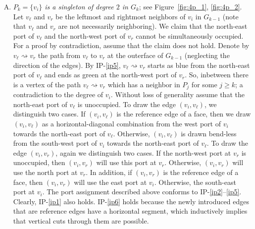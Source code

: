 \documentclass[a4paper,twoside,11pt]{article}
\begin{document}
\begin{enumerate}[C.1:]

\item \label{c:sing3} \emph{$P_k = \{ v_i \}$ is a singleton of
degree $2$ in $G_k$}; see Figure~\ref{fig:4p_1}, \ref{fig:4p_2}. Let
$v_\ell$ and $v_r$ be the leftmost and rightmost neighbors of $v_i$ in
$G_{k-1}$ (note that $v_\ell$ and $v_r$ are not necessarily
neighboring). We claim that the north-east port of $v_\ell$ and the
north-west port of $v_r$ cannot be simultaneously occupied. For a
proof by contradiction, assume that the claim does not hold. Denote
by $v_\ell \rightsquigarrow v_r$ the path from $v_\ell$ to $v_r$ at
the outerface of $G_{k-1}$ (neglecting the direction of the edges).
By IP-\ref{ip5}, $v_\ell \rightsquigarrow v_r$ starts as blue from
the north-east port of $v_\ell$ and ends as green at the north-west
port of $v_r$. So, inbetween there is a vertex of the path $v_\ell
\rightsquigarrow v_r$ which has a neighbor in $P_j$ for some $j \geq
k$; a contradiction to the degree of $v_i$. Without loss of generality
assume that the north-east port of $v_\ell$ is unoccupied. To draw
the edge $(v_i,v_\ell)$, we distinguish two cases. If $(v_i,v_\ell)$
is the reference edge of a face, then we draw $(v_i,v_\ell)$ as a
horizontal-diagonal combination from the west port of $v_i$ towards
the north-east port of $v_\ell$. Otherwise, $(v_i,v_\ell)$ is drawn
bend-less from the south-west port of $v_i$ towards the north-east 
port of $v_\ell$. To draw the edge $(v_i,v_r)$, again we distinguish
two cases. If the north-west port at $v_r$ is unoccupied, then
$(v_i,v_r)$ will use this port at $v_r$. Otherwise, $(v_i,v_r)$ will
use the north port at $v_r$. In addition, if $(v_i,v_r)$ is the
reference edge of a face, then $(v_i,v_r)$ will use the east port at
$v_i$. Otherwise, the south-east port at $v_i$. The port assignment
described above conforms to IP-\ref{ip2}--\ref{ip5}. Clearly,
IP-\ref{ip1} also holds. IP-\ref{ip6} holds because the newly
introduced edges that are reference edges have a horizontal segment,
which inductively implies that vertical cuts through them are possible.


\end{enumerate}
\end{document}
